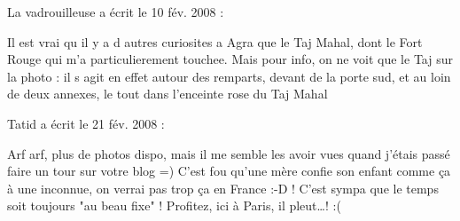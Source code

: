 \medskip
La vadrouilleuse a écrit le 10 fév. 2008 :
\begin{displayquote}
Il est vrai qu il y a d autres curiosites a Agra que le Taj Mahal, dont le Fort Rouge qui m'a particulierement touchee. Mais pour info, on ne voit que le Taj sur la photo : il s agit en effet autour des remparts, devant de la porte sud, et au loin de deux annexes, le tout dans l'enceinte rose du Taj Mahal
\end{displayquote}

\medskip
Tatid a écrit le 21 fév. 2008 :
\begin{displayquote}
Arf arf, plus de photos dispo, mais il me semble les avoir vues quand j'étais passé faire un tour sur votre blog =)
C'est fou qu'une mère confie son enfant comme ça à une inconnue, on verrai pas trop ça en France :-D ! C'est sympa que le temps soit toujours "au beau fixe" ! Profitez, ici à Paris, il pleut\dots ! :(
\end{displayquote}

\vfill

